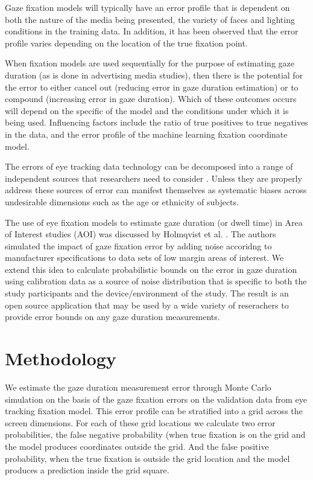 \documentclass[12pt,a4paper]{article}
\numberwithin{equation}{section}
\begin{document}
Gaze fixation models will typically have an error profile that is dependent on both 
the nature of the media being presented, the variety of faces and lighting conditions 
in the training data. In addition, it has been observed that the error profile varies 
depending on the location of the true fixation point.

When fixation models are used sequentially for the purpose of estimating gaze duration
(as is done in advertising media studies), then there is the potential for the error
to either cancel out (reducing error in gaze duration estimation) or to compound
(increasing error in gaze duration). Which of these outcomes occurs will depend on the
specific of the model and the conditions under which it is being used.
Influencing factors include the ratio of true positives to true negatives in the data,
and the error profile of the machine learning fixation coordinate model.

The errors of eye tracking data technology can be decomposed into a range of
independent sources that researchers need to consider \cite{Holmqvist2012}.
Unless they are properly address these sources of error can manifest themselves
as systematic biases across undesirable dimensions such as the age\cite{Dalrymple2018}
or ethnicity of subjects\cite{Blignaut2013}. 

The use of eye fixation models to estimate gaze duration (or dwell time) in Area of
Interest studies (AOI) was discussed by Holmqvist et al. \cite{Holmqvist2012}. The
authors simulated the impact of gaze fixation error by adding noise accoridng to
manufacturer specifications to data sets of low margin areas of interest. We extend 
this idea to calculate probabilistic bounds on the error in gaze duration using
calibration data as a source of noise distribution that is specific to both the
study participants and the device/environment of the study. The result is an open
source application that may be used by a wide variety of reserachers to provide
error bounds on any gaze duration measurements.


\section{Methodology}

We estimate the gaze duration measurement error through Monte Carlo simulation
on the basis of the gaze fixation errors on the validation data from eye tracking
fixation model. This error profile can be stratified into a grid across the screen dimensions. For each of these grid locations we calculate two error probabilities, the false negative probability (when true fixation is on the grid and the model produces coordinates outside the grid. And the false positive probability, when the true fixation is outside the grid location and the model produces a prediction inside the grid square.
\end{document}

